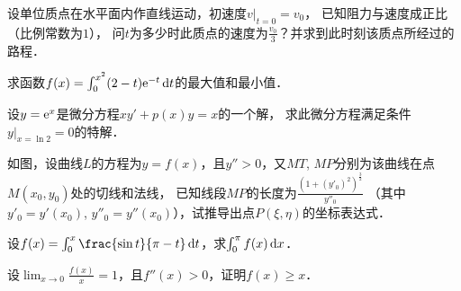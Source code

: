 \documentclass[plain,noanswer,medmath]{../../template/jnuexam}
\begin{document}
\begin{problem}
设单位质点在水平面内作直线运动，初速度$v\big|_{t = 0} = v_0$，
已知阻力与速度成正比（比例常数为$1$），
问$t$为多少时此质点的速度为$\frac{v_0}{3}$？并求到此时刻该质点所经过的路程．
\end{problem}



\begin{problem}
求函数$f(x) = \int_0^{x^2} (2 - t) \mathrm{e}^{- t} \mathop{}\!\mathrm{d} t$的最大值和最小值．
\end{problem}



\begin{problem}
设$y = \mathrm{e}^x$是微分方程$xy' + p(x)y = x$的一个解，
求此微分方程满足条件$y\big|_{x=\ln2}=0$的特解．
\end{problem}



\begin{problem}
如图，设曲线$L$的方程为$y = f(x)$，且$y'' > 0$，又$MT$, $MP$分别为该曲线在点$M(x_0,y_0)$处的切线和法线，
已知线段$MP$的长度为$\frac{\left(1 + (y'_0)^2 \right)^{\frac{3}{2}}}{y''_0}$%
（其中$y'_0 = y'(x_0)$, $y''_0 = y''(x_0)$），试推导出点$P(\xi ,\eta)$的坐标表达式．
 
\end{problem}



\begin{problem}
设$f(x) = \int_0^x \frac{\sin t}{\pi - t} \dt$，求$\int_0^{\pi}f(x)\mathop{}\!\mathrm{d} x$．
\end{problem}



\begin{problem}
设$\lim_{x \to 0} \frac{f(x)}{x} = 1$，且$f''(x) > 0$，证明$f(x) \ge x$．
\end{problem}
\end{document}
